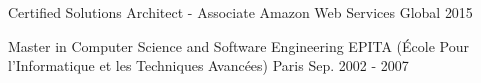 
\begin{cventries}

  \cventry
    {Certified Solutions Architect - Associate} %
    {Amazon Web Services} %
    {Global} %
    {2015} %
    {} %
    \vspace{-0.4cm}

  \cventry
    {Master in Computer Science and Software Engineering} %
    {EPITA (École Pour l'Informatique et les Techniques Avancées)} %
    {Paris} %
    {Sep. 2002 - 2007} %
    {} %
    \vspace{-0.4cm}

\end{cventries}
